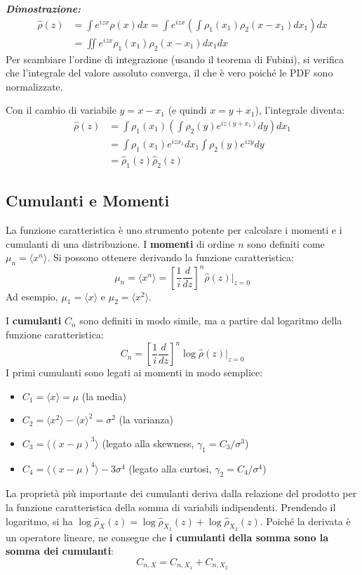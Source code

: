 \textbf{\textit{Dimostrazione:}}
\begin{align*}
\hat{\rho}(z) &= \int e^{izx} \rho(x) dx = \int e^{izx} \left( \int \rho_1(x_1) \rho_2(x-x_1) dx_1 \right) dx \\
&= \iint e^{izx} \rho_1(x_1) \rho_2(x-x_1) dx_1 dx
\end{align*}
Per scambiare l'ordine di integrazione (usando il teorema di Fubini), si verifica che l'integrale del valore assoluto converga, il che è vero poiché le PDF sono normalizzate. 

Con il cambio di variabile $y=x-x_1$ (e quindi $x=y+x_1$), l'integrale diventa:
\begin{align*}
\hat{\rho}(z) &= \int \rho_1(x_1) \left( \int \rho_2(y) e^{iz(y+x_1)} dy \right) dx_1 \\
&= \int \rho_1(x_1) e^{izx_1} dx_1 \int \rho_2(y) e^{izy} dy \\
&= \hat{\rho}_1(z) \hat{\rho}_2(z)
\end{align*}

\subsection{Cumulanti e Momenti}

La funzione caratteristica è uno strumento potente per calcolare i momenti e i cumulanti di una distribuzione. I \textbf{momenti} di ordine $n$ sono definiti come $\mu_n = \langle x^n \rangle$. Si possono ottenere derivando la funzione caratteristica:
\begin{equation}
\mu_n = \langle x^n \rangle = \left[\frac{1}{i}\frac{d}{dz}\right]^n \hat{\rho}(z) \bigg|_{z=0}
\end{equation}
Ad esempio, $\mu_1 = \langle x \rangle$ e $\mu_2 = \langle x^2 \rangle$.

I \textbf{cumulanti} $C_n$ sono definiti in modo simile, ma a partire dal logaritmo della funzione caratteristica:
\begin{equation}
C_n = \left[\frac{1}{i}\frac{d}{dz}\right]^n \log\hat{\rho}(z) \bigg|_{z=0}
\end{equation}
I primi cumulanti sono legati ai momenti in modo semplice:
\begin{itemize}
    \item $C_1 = \langle x \rangle = \mu$ (la media)
    \item $C_2 = \langle x^2 \rangle - \langle x \rangle^2 = \sigma^2$ (la varianza)
    \item $C_3 = \langle (x-\mu)^3 \rangle$ (legato alla skewness, $\gamma_1 = C_3/\sigma^3$)
    \item $C_4 = \langle (x-\mu)^4 \rangle - 3\sigma^4$ (legato alla curtosi, $\gamma_2 = C_4/\sigma^4$)
\end{itemize}
La proprietà più importante dei cumulanti deriva dalla relazione del prodotto per la funzione caratteristica della somma di variabili indipendenti. Prendendo il logaritmo, si ha $\log \hat{\rho}_X(z) = \log \hat{\rho}_{X_1}(z) + \log \hat{\rho}_{X_2}(z)$. Poiché la derivata è un operatore lineare, ne consegue che \textbf{i cumulanti della somma sono la somma dei cumulanti}:
\begin{equation}
C_{n,X} = C_{n,X_1} + C_{n,X_2}
\end{equation}


